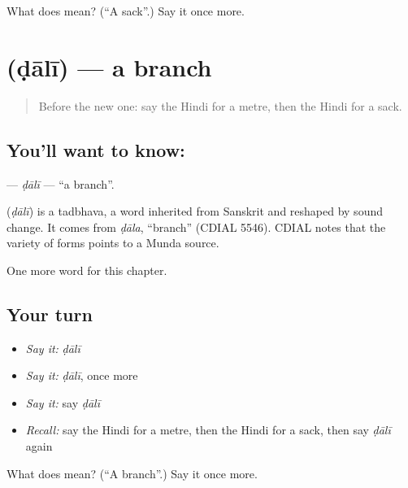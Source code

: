 \begin{tcolorbox}[breakable,colback=teal!4,colframe=teal!35!black,title={Before you move on}]
What does  mean? (\textquotedblleft{}A sack\textquotedblright{}.) Say it once more.
\end{tcolorbox}
\section[\texorpdfstring{\hi{डाली} (ḍālī)}{डाली (ḍālī)}]{ (ḍālī) — a branch}

\label{lesson:HI-C252-dali}



\begin{quote}
Before the new one: say the Hindi for a metre, then the Hindi for a sack.
\end{quote}

\subsection*{You'll want to know: }
\textbf{} — \emph{ḍālī} — \textquotedblleft{}a branch\textquotedblright{}.

\begin{cousinweb}
\textbf{} (\emph{ḍālī}) is a tadbhava, a word inherited from Sanskrit and reshaped by sound change. It comes from \emph{ḍāla}, \textquotedblleft{}branch\textquotedblright{} (CDIAL 5546). CDIAL notes that the variety of forms points to a Munda source.
\end{cousinweb}

\begin{grammarlens}[title={What you've built}]
One more word for this chapter.
\end{grammarlens}

\subsection*{Your turn}
\begin{itemize}
\raggedright
  \item \emph{Say it:} \emph{ḍālī}
  \item \emph{Say it:} \emph{ḍālī}, once more
  \item \emph{Say it:} say \emph{ḍālī}
  \item \emph{Recall:} say the Hindi for a metre, then the Hindi for a sack, then say \emph{ḍālī} again
\end{itemize}

\begin{tcolorbox}[breakable,colback=teal!4,colframe=teal!35!black,title={Before you move on}]
What does  mean? (\textquotedblleft{}A branch\textquotedblright{}.) Say it once more.
\end{tcolorbox}
